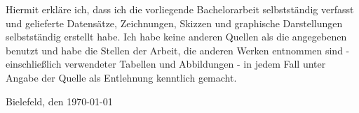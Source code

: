 \documentclass[../Main.tex]{subfiles}
\begin{document}
\vspace*{2\baselineskip}

Hiermit erkläre ich, dass ich die vorliegende Bachelorarbeit selbstständig verfasst und
gelieferte Datensätze, Zeichnungen, Skizzen und graphische Darstellungen selbstständig
erstellt habe. Ich habe keine anderen Quellen als die angegebenen benutzt und habe die
Stellen der Arbeit, die anderen Werken entnommen sind - einschlie{\ss}lich verwendeter
Tabellen und Abbildungen - in jedem Fall unter Angabe der Quelle als Entlehnung kenntlich
gemacht.

\vspace*{3\baselineskip}

\center Bielefeld, den \today
\vspace*{3\baselineskip}


\makeatletter
\newcommand*{\textoverline}[1]{$\overline{\hbox{#1}}\m@th$}
\makeatother


\makebox[2.5in]{\hrulefill}

\end{document}
